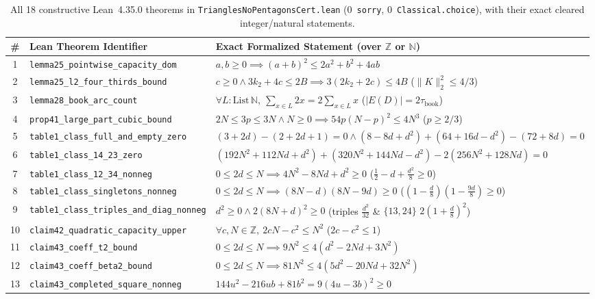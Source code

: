 \documentclass[10pt,twocolumn]{article}
\begin{document}
\begin{table}[t]
\centering
\scriptsize
\setlength{\tabcolsep}{3.0pt}
\caption{All 18 constructive Lean~4.35.0 theorems in \texttt{TrianglesNoPentagonsCert.lean} (0~\texttt{sorry}, 0~\texttt{Classical.choice}), with their exact cleared integer/natural statements.}
\label{tab:lean}
\begin{tabular}{@{}cll@{}}
\toprule
\# & Lean Theorem Identifier & Exact Formalized Statement (over $\mathbb{Z}$ or $\mathbb{N}$) \\
\midrule
1 & \texttt{lemma25\_pointwise\_capacity\_dom} & $a,b\ge 0 \implies (a+b)^2 \le 2a^2 + b^2 + 4ab$ \\
2 & \texttt{lemma25\_l2\_four\_thirds\_bound} & $c\ge 0 \wedge 3k_2 + 4c \le 2B \implies 3(2k_2 + 2c) \le 4B$ ($\|K\|_2^2 \le 4/3$) \\
3 & \texttt{lemma28\_book\_arc\_count} & $\forall L:\mathrm{List}\,\mathbb{N},\ \sum_{x\in L} 2x = 2\sum_{x\in L} x$ ($|E(D)|=2\tau_{\mathrm{book}}$) \\
4 & \texttt{prop41\_large\_part\_cubic\_bound} & $2N\le 3p\le 3N \wedge N\ge 0 \implies 54p(N-p)^2 \le 4N^3$ ($p\ge 2/3$) \\
5 & \texttt{table1\_class\_full\_and\_empty\_zero} & $(3+2d)-(2+2d+1)=0 \wedge (8-8d+d^2)+(64+16d-d^2)-(72+8d)=0$ \\
6 & \texttt{table1\_class\_14\_23\_zero} & $(192N^2+112Nd+d^2)+(320N^2+144Nd-d^2)-2(256N^2+128Nd)=0$ \\
7 & \texttt{table1\_class\_12\_34\_nonneg} & $0\le 2d\le N \implies 4N^2 - 8Nd + d^2 \ge 0$ ($\tfrac{1}{2}-d+\tfrac{d^2}{8}\ge 0$) \\
8 & \texttt{table1\_class\_singletons\_nonneg} & $0\le 2d\le N \implies (8N-d)(8N-9d) \ge 0$ ($(1-\tfrac{d}{8})(1-\tfrac{9d}{8})\ge 0$) \\
9 & \texttt{table1\_class\_triples\_and\_diag\_nonneg} & $d^2 \ge 0 \wedge 2(8N+d)^2 \ge 0$ (triples $\tfrac{d^2}{32}$ \& $\{13,24\}$ $2(1+\tfrac{d}{8})^2$) \\
10 & \texttt{claim42\_quadratic\_capacity\_upper} & $\forall c,N\in\mathbb{Z},\ 2cN - c^2 \le N^2$ ($2c - c^2 \le 1$) \\
11 & \texttt{claim43\_coeff\_t2\_bound} & $0\le 2d\le N \implies 9N^2 \le 4(d^2 - 2Nd + 3N^2)$ \\
12 & \texttt{claim43\_coeff\_beta2\_bound} & $0\le 2d\le N \implies 81N^2 \le 4(5d^2 - 20Nd + 32N^2)$ \\
13 & \texttt{claim43\_completed\_square\_nonneg} & $144u^2 - 216ub + 81b^2 = 9(4u - 3b)^2 \ge 0$ \\

\end{tabular}
\end{table}
\end{document}
